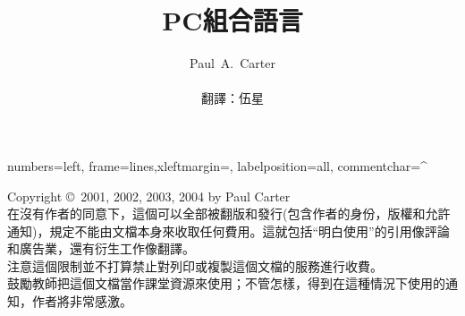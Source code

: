\documentclass[11pt,utf8]{ctexbookutf8}
\author{Paul~A.~Carter\\ \\翻譯：伍星}
\title{PC組合語言}
\begin{document}
\begin{CJK}{UTF8}{songext}
\maketitle
\newlength{\AsmMargin}
\setlength{\AsmMargin}{-1cm}
{numbers=left, frame=lines,xleftmargin=\AsmMargin, labelposition=all, commentchar=^ }

\newcommand{\MarginNote}[1]{\marginpar{\sloppy \em \small #1}}
\thispagestyle{empty}
\vspace*{\fill}
\noindent Copyright \copyright\  2001, 2002, 2003, 2004 by Paul Carter\\

\noindent
在沒有作者的同意下，這個可以全部被翻版和發行(包含作者的身份，版權和允許通知)，規定不能由文檔本身來收取任何費用。這就包括``明白使用''的引用像評論和廣告業，還有衍生工作像翻譯。\\

\noindent 注意這個限制並不打算禁止對列印或複製這個文檔的服務進行收費。\\

\noindent
鼓勵教師把這個文檔當作課堂資源來使用；不管怎樣，得到在這種情況下使用的通知，作者將非常感激。


\tableofcontents
\vfill \frontmatter


\mainmatter







%
\begin{appendix}

\end{appendix}
\clearpage
\ifpdf
{} %
\fi 
{}
\printindex
\end{CJK}
\end{document}
